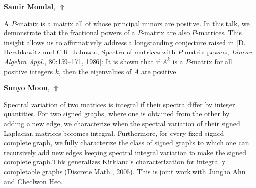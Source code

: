 \documentclass[ILAS2025-program.tex]{subfiles}
\begin{document}
\hypertarget{down0104}{}\begin{ilasabstract}
    
\textbf{Samir Mondal},  \hfill \hyperlink{up0104}{$\Uparrow$}
    
    
\mtskip
    A $P$-matrix is a matrix all of whose principal minors are positive. In this talk, we demonstrate that the fractional 
powers of a $P$-matrix are also $P$-matrices. This insight allows us to affirmatively address a 
longstanding conjecture raised in [D. Hershkowitz and C.R. Johnson, Spectra of matrices with
$P$-matrix powers, {\it Linear Algebra Appl.}, 80:159--171, 1986]: It is shown that if $A^k$ is a $P$-matrix 
for all positive integers $k$, then the eigenvalues of $A$ are positive.

\end{ilasabstract}
    

\hypertarget{down0109}{}\begin{ilasabstract}
    
\textbf{Sunyo Moon},  \hfill \hyperlink{up0109}{$\Uparrow$}
    
    
\mtskip
    Spectral variation of two matrices is integral if their spectra differ by integer quantities. For two signed graphs, where one is obtained from the other by adding a new edge, we characterize when the spectral variation of their signed Laplacian matrices becomes integral. Furthermore, for every fixed signed complete graph, we fully characterize the class of signed graphs to which one can recursively add new edges keeping spectral integral variation to make the signed complete graph.This generalizes Kirkland's characterization for integrally completable graphs (Discrete Math., 2005). This is joint work with Jungho Ahn and Cheolwon Heo.

\end{ilasabstract}
    
\end{document}
